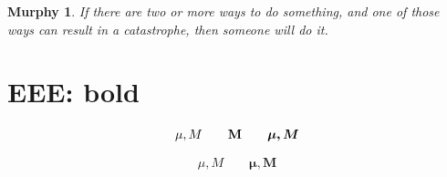\documentclass{article}
\begin{document}
\flushleft
\newtheorem{mur}{Murphy}[section]
\begin{mur}
If there are two or more
ways to do something, and
one of those ways can result
in a catastrophe, then
someone will do it.\end{mur}


\section{EEE: bold}

\begin{displaymath}
\mu, M \qquad \mathbf{M} \qquad
\mbox{\boldmath $\mu, M$}
\end{displaymath}


\begin{displaymath}
\mu, M \qquad
\boldsymbol{\mu}, \boldsymbol{M}
\end{displaymath}
\end{document}
